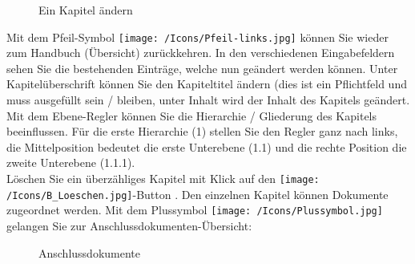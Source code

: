 \begin{figure}[H]
\caption{Ein Kapitel ändern}
\end{figure}

Mit dem Pfeil-Symbol \texttt{[image: /Icons/Pfeil-links.jpg]}  können Sie wieder zum Handbuch (Übersicht) zurückkehren. In den verschiedenen Eingabefeldern sehen Sie die bestehenden Einträge, welche nun geändert werden können. Unter Kapitelüberschrift  können Sie den Kapiteltitel ändern (dies ist ein Pflichtfeld und muss ausgefüllt sein / bleiben, unter Inhalt  wird der Inhalt des Kapitels geändert. Mit dem Ebene-Regler  können Sie die Hierarchie / Gliederung des Kapitels beeinflussen. Für die erste Hierarchie (1) stellen Sie den Regler ganz nach links, die Mittelposition bedeutet die erste Unterebene (1.1) und die rechte Position die zweite Unterebene (1.1.1). \\
Löschen Sie ein überzähliges Kapitel mit Klick auf den \texttt{[image: /Icons/B\_Loeschen.jpg]}-Button .
Den einzelnen Kapitel können Dokumente zugeordnet werden. Mit dem Plussymbol \texttt{[image: /Icons/Plussymbol.jpg]}  gelangen Sie zur Anschlussdokumenten-Übersicht:

\begin{figure}[H]
\caption{Anschlussdokumente}
\end{figure}

